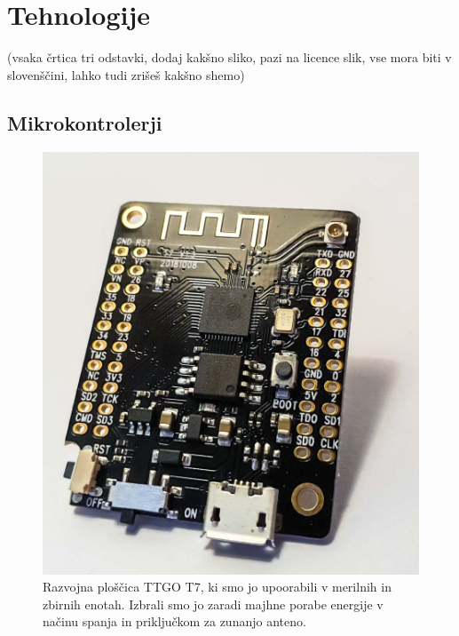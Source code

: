 \documentclass[a4paper, 12pt]{book}
\begin{document}
\chapter{Tehnologije}
(vsaka črtica tri odstavki, dodaj kakšno sliko, pazi na licence slik, vse mora biti v slovenščini, lahko tudi zrišeš kakšno shemo)

\section{Mikrokontrolerji}



\begin{figure}[H]
    \centering
    \includegraphics[width=\linewidth]{slikovno_gradivo/ESP32_1.jpg}
    \caption{Razvojna ploščica TTGO T7, ki smo jo upoorabili v merilnih in zbirnih enotah. Izbrali smo jo zaradi majhne porabe energije v načinu spanja in priključkom za zunanjo anteno.}
    \label{fig:TTGO_T7}
\end{figure}
\end{document}
